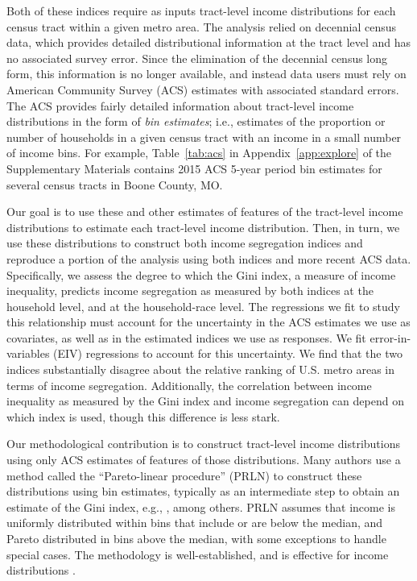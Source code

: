 \documentclass[12pt]{article}
\begin{document}
Both of these indices require as inputs tract-level income distributions for each census tract within a given metro area. The \citet{reardon2011income} analysis relied on decennial census data, which provides detailed distributional information at the tract level and has no associated survey error. Since the elimination of the decennial census long form, this information is no longer available, and instead data users must rely on American Community Survey (ACS) estimates with associated standard errors. The ACS provides fairly detailed information about tract-level income distributions in the form of \emph{bin estimates}; i.e., estimates of the proportion or number of households in a given census tract with an income in a small number of income bins. For example, Table~\ref{tab:acs} in Appendix~\ref{app:explore} of the Supplementary Materials contains 2015 ACS 5-year period bin estimates for several census tracts in Boone County, MO.

Our goal is to use these and other estimates of features of the tract-level income distributions to estimate each tract-level income distribution. Then, in turn, we use these distributions to construct both income segregation indices and reproduce a portion of the \citet{reardon2011income} analysis using both indices and more recent ACS data. Specifically, we assess the degree to which the Gini index, a measure of income inequality, predicts income segregation as measured by both indices at the household level, and at the household-race level. The regressions we fit to study this relationship must account for the uncertainty in the ACS estimates we use as covariates, as well as in the estimated indices we use as responses. We fit error-in-variables (EIV) regressions to account for this uncertainty. We find that the two indices substantially disagree about the relative ranking of U.S. metro areas in terms of income segregation. Additionally, the correlation between income inequality as measured by the Gini index and income segregation can depend on which index is used, though this difference is less stark.

Our methodological contribution is to construct tract-level income distributions using only ACS estimates of features of those distributions. Many authors use a method called the ``Pareto-linear procedure'' (PRLN) to construct these distributions using bin estimates, typically as an intermediate step to obtain an estimate of the Gini index, e.g., \citet{jargowsky1996take,nielsen1997kuznets,hipp2007block,hipp2007income,moller2009changing,hipp2013extrapolative,braithwaite2015sexual}, among others. PRLN assumes that income is uniformly distributed within bins that include or are below the median, and Pareto distributed in bins above the median, with some exceptions to handle special cases. The methodology is well-established, and is effective for income distributions \citep{miller1966income,aigner1970estimation,kakwani1976efficient,spiers1977prln,henson1980money,welniak1988calculating}. 
\end{document}
